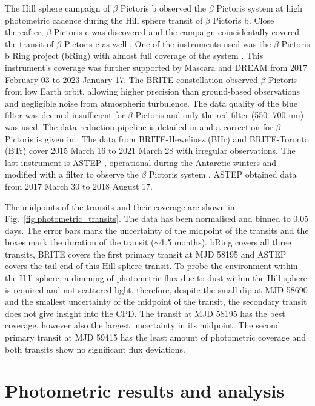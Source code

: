 \documentclass{aa}
\newcommand\picb{$\beta$ Pictoris b}
\newcommand\picc{$\beta$ Pictoris c}
\newcommand\pic{$\beta$ Pictoris}
\begin{document}
	The Hill sphere campaign of \picb{} \citep{Kenworthy_2021} observed the \pic{} system at high photometric cadence during the Hill sphere transit of \picb{}.
	Close thereafter, \picc{} was discovered and the campaign coincidentally covered the transit of \picc{} as well \citep{Stuik_2017}. 
	One of the instruments used was the \pic{} b Ring project (bRing) with almost full coverage of the system \citep{Snellen_2012,Snellen_2013,Stuik_2014, Stuik_2016,Talens_2017,Talens_2018}.
	This instrument's coverage was further supported by Mascara and DREAM from 2017 February 03 to 2023 January 17.
	The BRITE constellation \citep[BRIght Target Explorer; ][]{Weiss_2014} observed \pic{} from low Earth orbit, allowing higher precision than ground-based observations and negligible noise from atmospheric turbulence.  
	The data quality of the blue filter was deemed insufficient for \pic{} \citep{Zwintz_2019} and only the red filter (550 -700 nm) was used. 
	The data reduction pipeline is detailed in \citet{Popowic_2017} and a correction for \pic{} is given in \citet{Zwintz_2019}. 
	The data from BRITE-Heweliusz (BHr) and BRITE-Toronto (BTr) cover 2015 March 16 to 2021 March 28 with irregular observations. 
	The last instrument is ASTEP \citep{Crouzet_2010}, operational during the Antarctic winters and modified with a filter to observe the \pic{} system \citep{Kenworthy_2021}. 
	ASTEP obtained data from 2017 March 30 to 2018 August 17.
	
	The midpoints of the transits and their coverage are shown in Fig.~\ref{fig:photometric_transits}. 
	The data has been normalised and binned to 0.05 days.
	The error bars mark the uncertainty of the midpoint of the transits and the boxes mark the duration of the transit ($\sim$1.5 months). 
	bRing covers all three transits, BRITE covers the first primary transit at MJD 58195 and ASTEP covers the tail end of this Hill sphere transit.
	To probe the environment within the Hill sphere, a dimming of photometric flux due to dust within the Hill sphere is required and not scattered light, therefore, despite the small dip at MJD 58690 and the smallest uncertainty of the midpoint of the transit, the secondary transit does not give insight into the CPD.
	The transit at MJD 58195 has the best coverage, however also the largest uncertainty in its midpoint.
	The second primary transit at MJD 59415 has the least amount of photometric coverage and both transits show no significant flux deviations. 
	\section{Photometric results and analysis}\label{sec:Photo_Results}
\end{document}
